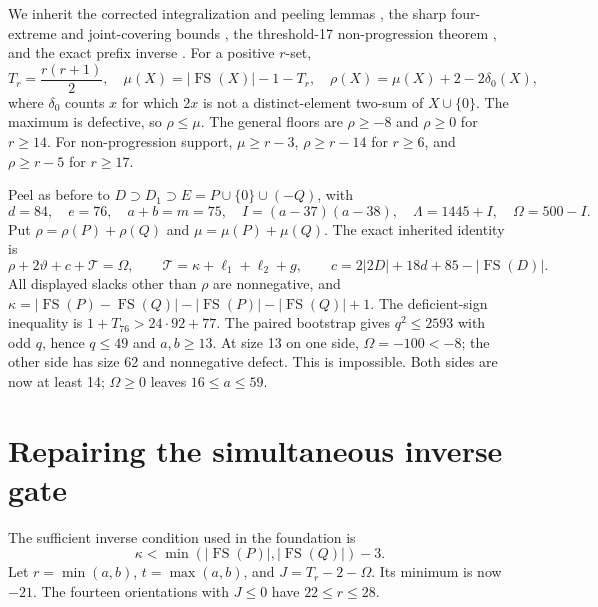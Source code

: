 \documentclass[11pt,a4paper]{article}
\newcommand{\FS}{\operatorname{FS}}
\newcommand{\T}{\mathcal T}
\begin{document}
We inherit the corrected integralization and peeling lemmas
\cite{foundation}, the sharp four-extreme and joint-covering bounds
\cite{overlap}, the threshold-17 non-progression theorem \cite{sharp},
and the exact prefix inverse \cite{prefix}. For a positive $r$-set,
\[
 T_r=\frac{r(r+1)}2,\quad
 \mu(X)=|\FS(X)|-1-T_r,\quad
 \rho(X)=\mu(X)+2-2\delta_0(X),
\]
where $\delta_0$ counts $x$ for which $2x$ is not a distinct-element
two-sum of $X\cup\{0\}$. The maximum is defective, so $\rho\le\mu$.
The general floors are $\rho\ge-8$ and $\rho\ge0$ for $r\ge14$.
For non-progression support, $\mu\ge r-3$, $\rho\ge r-14$ for $r\ge6$,
and $\rho\ge r-5$ for $r\ge17$.

Peel as before to $D\supset D_1\supset E=P\cup\{0\}\cup(-Q)$, with
\[
 d=84,\quad e=76,\quad a+b=m=75,\quad I=(a-37)(a-38),
 \quad\Lambda=1445+I,\quad\Omega=500-I.
\]
Put $\rho=\rho(P)+\rho(Q)$ and $\mu=\mu(P)+\mu(Q)$.
The exact inherited identity is
\begin{equation}\label{identity}
 \rho+2\vartheta+c+\T=\Omega,\qquad
 \T=\kappa+\ell_1+\ell_2+g,
 \qquad c=2|2D|+18d+85-|\FS(D)|.
\end{equation}
All displayed slacks other than $\rho$ are nonnegative, and
$\kappa=|\FS(P)-\FS(Q)|-|\FS(P)|-|\FS(Q)|+1$.
The deficient-sign inequality is $1+T_{76}>24\cdot92+77$.
The paired bootstrap gives $q^2\le2593$ with odd $q$, hence $q\le49$
and $a,b\ge13$. At size 13 on one side, $\Omega=-100<-8$;
the other side has size 62 and nonnegative defect. This is impossible.
Both sides are now at least 14; $\Omega\ge0$ leaves $16\le a\le59$.

\section{Repairing the simultaneous inverse gate}
The sufficient inverse condition used in the foundation is
\begin{equation}\label{inverse}
 \kappa<\min(|\FS(P)|,|\FS(Q)|)-3.
\end{equation}
Let $r=\min(a,b)$, $t=\max(a,b)$, and
$J=T_r-2-\Omega$. Its minimum is now $-21$.
The fourteen orientations with $J\le0$ have $22\le r\le28$.
\end{document}
